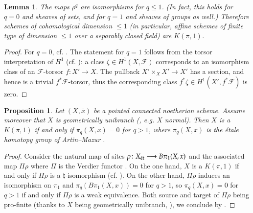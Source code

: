 \documentclass[twoside]{amsart}
\newcommand{\Ff}{\mathscr{F}}
\newcommand{\et}{{\rm\acute{e}t}}
\renewcommand{\to}{\longrightarrow}
\renewcommand{\bar}{\overline}
\theoremstyle{plain}
\newtheorem{lemma}[subsubsection]{Lemma}
\newtheorem{proposition}[subsubsection]{Proposition}
\theoremstyle{definition}
\theoremstyle{remark}
\numberwithin{equation}{subsection}
\begin{document}
\begin{lemma} \label{lemma:kpi1q1}
	The maps $\rho^q$ are isomorphisms for $q\leq 1$. (In fact, this holds for $q=0$ and sheaves of sets, and for $q=1$ and sheaves of groups as well.) Therefore schemes of cohomological dimension $\leq 1$ (in particular, affine schemes of finite type of dimension $\leq 1$ over a separably closed field) are $K(\pi, 1)$.
\end{lemma}

\begin{proof}
For $q=0$, cf. \cite[Proposition 9.17]{Higgs2}. The statement for $q=1$ follows from the torsor interpretation of $H^1$ (cf. \cite[Remark~5.2]{Olsson}): a class $\zeta\in H^1(X, \Ff)$ corresponds to an isomorphism class of an $\Ff$-torsor $f\colon X'\to X$. The pullback $X'\times_X X'\to X'$ has a section, and hence is a trivial $f^*\Ff$-torsor, thus the corresponding class $f^* \zeta \in H^1(X', f^*\Ff)$ is zero. 
\end{proof}

\begin{proposition} \label{prop:kpi1artinmazur}
	Let $(X, \bar x)$ be a pointed connected noetherian scheme. Assume moreover that $X$ is geometrically unibranch (\cite[6.15.1]{EGAIV}, e.g. $X$ normal). Then $X$ is a $K(\pi, 1)$ if and only if $\pi_q(X,x)=0$ for $q>1$, where $\pi_q(X,x)$ is the \'etale homotopy group of Artin--Mazur \cite{ArtinMazur}.
\end{proposition}

\begin{proof}
Consider the natural map of sites $\rho\colon X_\et \to B\pi_1(X, x)$ and the associated map $\Pi \rho$ where $\Pi$ is the Verdier functor \cite[\S 9]{ArtinMazur}. On the one hand, $X$ is a $K(\pi, 1)$ if and only if $\Pi\rho$ is a $\natural$-isomorphism (cf. \cite[Theorem 4.3]{ArtinMazur}). On the other hand, $\Pi\rho$ induces an isomorphism on $\pi_1$ and $\pi_q(B\pi_1(X, x))=0$ for $q>1$, so $\pi_q(X,x)=0$ for $q>1$ if and only if $\Pi\rho$ is a weak equivalence. Both source and target of $\Pi\rho$ being pro-finite (thanks to $X$ being geometrically unibranch, \cite[Theorem~11.1]{ArtinMazur}), we conclude by \cite[Corollary 4.4]{ArtinMazur}.
\end{proof}
\end{document}
